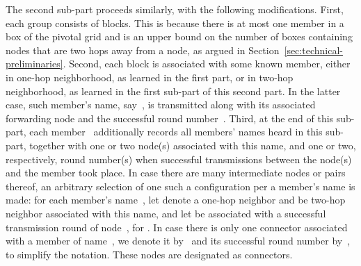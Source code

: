 \documentclass[11pt]{article}
\begin{document}
The second sub-part proceeds similarly, with the following modifications.
First, each group consists of  blocks.
This is because there is at most one member in a box of the pivotal grid and  is an upper bound on the number of boxes containing nodes that are two hops away from a node,  as argued in Section~\ref{sec:technical-preliminaries}.
Second, each block is associated with some known member, either in one-hop neighborhood, as learned in the first part, or in two-hop neighborhood, as learned in  the first sub-part of this second part. 
In the latter case, such member's name, say~, is transmitted along with  its associated forwarding node  and the successful round number~.
Third, at the end of this sub-part, each member~ additionally records all members' names  heard in this sub-part, together with one or two node(s)  associated with this name, and one or two, respectively,  round number(s) when successful transmissions between the node(s) and the member took place. 
In case there are many  intermediate nodes or pairs thereof, an arbitrary selection of one such a configuration per a member's name is made:  for each member's name~, let  denote a one-hop neighbor and  be two-hop neighbor associated with this name, and let  be associated with a successful transmission round of node~, for .
In case there is only one connector associated with a member of name~, we denote it by~ and its successful round number by~, to simplify the notation.
These nodes are designated as connectors.
\end{document}
